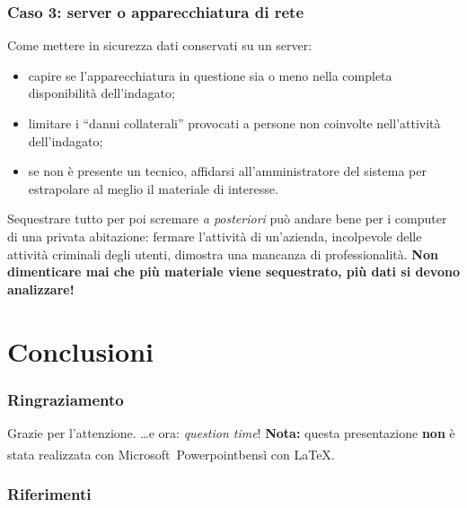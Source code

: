 \documentclass[11pt]{beamer}
\begin{document}
	\begin{frame}
		\frametitle{Caso 3: server o apparecchiatura di rete}
		
		Come mettere in sicurezza dati conservati su un server:
		
		\begin{itemize}
			\item capire se l'apparecchiatura in questione sia o meno nella completa disponibilità dell'indagato;
			\item limitare i ``danni collaterali'' provocati a persone non coinvolte nell'attività dell'indagato;
			\item se non è presente un tecnico, affidarsi all'amministratore del sistema per estrapolare al meglio il materiale di interesse.
			
		\end{itemize} 		
		Sequestrare tutto per poi scremare \textit{a posteriori} può andare bene per i computer  di una privata abitazione: fermare l'attività di un'azienda, incolpevole delle attività criminali degli utenti, dimostra una mancanza di professionalità. 
		\vfill
		\textbf{Non dimenticare mai che più materiale viene sequestrato, più dati si devono analizzare!}
		
	\end{frame}
	
	
	\section{Conclusioni}	
	\begin{frame}
		\frametitle{Ringraziamento}
		\centering
		\Large Grazie per l'attenzione.
		\vfill
		\dots e ora: \textit{question time}!
		\vfill	
		\tiny \textbf{Nota:} questa presentazione \textbf{non} è stata realizzata con Microsoft~Powerpoint\textsuperscript\textcopyright bensì con \textsf{\LaTeX}.
	\end{frame}
	
	\begin{frame}
		\frametitle{Riferimenti}
		\tiny
		
		\setbeamertemplate{bibliography item}{\insertbiblabel}
		
	\end{frame}
\end{document}
